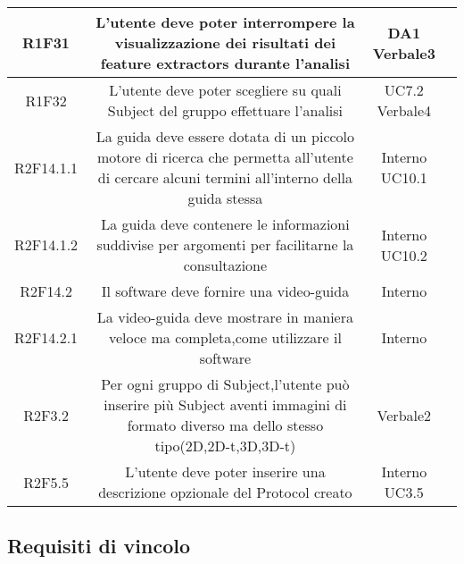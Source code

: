 \begin{center}
\begin{longtable}{|c|c|c|c|}
\hline
R1F31   & \parbox[t]{\larghezza}{L'utente deve poter interrompere la visualizzazione dei risultati dei feature extractors\glossario{} durante l'analisi }  & \parbox[t]{\dimFonti}{ DA1 \\ Verbale3 \\} \\
\hline
R1F32   & \parbox[t]{\larghezza}{L'utente deve poter scegliere su quali Subject\glossario{} del gruppo effettuare l'analisi}  & \parbox[t]{\dimFonti}{ UC7.2 \\ Verbale4 \\} \\
\hline
R2F14.1.1   & \parbox[t]{\larghezza}{La guida deve essere dotata di un piccolo motore di ricerca che permetta all'utente di cercare alcuni termini all'interno della guida stessa}  & \parbox[t]{\dimFonti}{ Interno \\ UC10.1 \\} \\
\hline
R2F14.1.2   & \parbox[t]{\larghezza}{La guida deve contenere le informazioni suddivise per argomenti per facilitarne la consultazione}  & \parbox[t]{\dimFonti}{ Interno \\ UC10.2 \\} \\
\hline
R2F14.2   & \parbox[t]{\larghezza}{Il software deve fornire una video-guida }  & \parbox[t]{\dimFonti}{ Interno \\} \\
\hline
R2F14.2.1   & \parbox[t]{\larghezza}{La video-guida deve mostrare in maniera veloce ma completa,come utilizzare il software }  & \parbox[t]{\dimFonti}{ Interno \\} \\
\hline
R2F3.2   & \parbox[t]{\larghezza}{Per ogni gruppo di Subject\glossario{},l'utente può inserire più Subject\glossario{} aventi immagini di formato diverso ma dello stesso tipo(2D,2D-t,3D,3D-t)}  & \parbox[t]{\dimFonti}{ Verbale2 \\} \\
\hline
R2F5.5   & \parbox[t]{\larghezza}{L'utente deve poter inserire una descrizione opzionale del Protocol\glossario{} creato }  & \parbox[t]{\dimFonti}{ Interno \\ UC3.5 \\} \\
\hline
\end{longtable}
\end{center}
\subsection{Requisiti di vincolo}
\label{requisitidivincolo}

